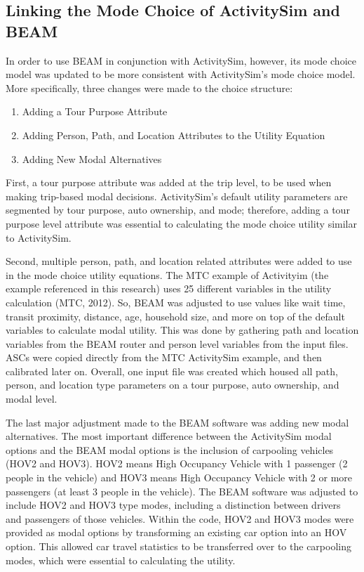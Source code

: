 \documentclass[fancy, masters]{byuthesis}
\providecommand{\tightlist}{%
  \setlength{\itemsep}{0pt}\setlength{\parskip}{0pt}}
\begin{document}
\hypertarget{meth-beam-link}{%
\subsection{Linking the Mode Choice of ActivitySim and BEAM}\label{meth-beam-link}}

In order to use BEAM in conjunction with ActivitySim, however, its mode choice model was updated to be more consistent with ActivitySim's mode choice model. More specifically, three changes were made to the choice structure:

\begin{enumerate}
\def\labelenumi{\arabic{enumi}.}
\tightlist
\item
  Adding a Tour Purpose Attribute
\item
  Adding Person, Path, and Location Attributes to the Utility Equation
\item
  Adding New Modal Alternatives
\end{enumerate}

First, a tour purpose attribute was added at the trip level, to be used when making trip-based modal decisions. ActivitySim's default utility parameters are segmented by tour purpose, auto ownership, and mode; therefore, adding a tour purpose level attribute was essential to calculating the mode choice utility similar to ActivitySim.

Second, multiple person, path, and location related attributes were added to use in the mode choice utility equations. The MTC example of Activityim (the example referenced in this research) uses 25 different variables in the utility calculation (MTC, 2012). So, BEAM was adjusted to use values like wait time, transit proximity, distance, age, household size, and more on top of the default variables to calculate modal utility. This was done by gathering path and location variables from the BEAM router and person level variables from the input files. ASCs were copied directly from the MTC ActivitySim example, and then calibrated later on. Overall, one input file was created which housed all path, person, and location type parameters on a tour purpose, auto ownership, and modal level.

The last major adjustment made to the BEAM software was adding new modal alternatives. The most important difference between the ActivitySim modal options and the BEAM modal options is the inclusion of carpooling vehicles (HOV2 and HOV3). HOV2 means High Occupancy Vehicle with 1 passenger (2 people in the vehicle) and HOV3 means High Occupancy Vehicle with 2 or more passengers (at least 3 people in the vehicle). The BEAM software was adjusted to include HOV2 and HOV3 type modes, including a distinction between drivers and passengers of those vehicles. Within the code, HOV2 and HOV3 modes were provided as modal options by transforming an existing car option into an HOV option. This allowed car travel statistics to be transferred over to the carpooling modes, which were essential to calculating the utility.
\end{document}

